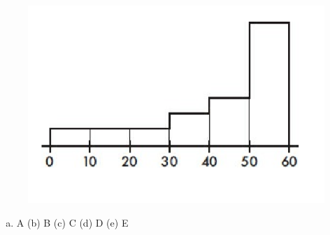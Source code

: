 \documentclass[a4paper,12pt,twoside]{book}
\begin{document}
\begin{itemize}
\begin{enumerate}
     \begin{figure}[H]
     \centering
     \includegraphics[scale=0.5]{figure9}
     \end{figure}
   
      \begin{enumerate}[(a)]
        \item A \hspace{0.6cm} (b) B  \hspace{0.6cm} (c) C
        \hspace{0.6cm} (d) D   \hspace{0.6cm} (e) E
      \end{enumerate}
      \vspace{0.3cm}
      

\end{enumerate}
\end{itemize}
\end{document}
